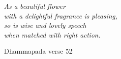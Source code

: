
\cleartorecto
\begin{quotepage}{60mm}
\centering
\itshape
As a beautiful flower\\
with a delightful fragrance is pleasing,\\
so is wise and lovely speech\\
when matched with right action.

{\smaller Dhammapada verse 52}
\end{quotepage}


